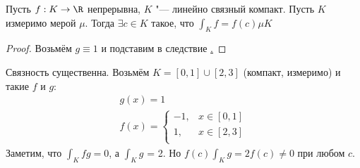 \begin{conseq}
	Пусть $f : K \to \R$ непрерывна, $K$ "--- линейно связный компакт.
	Пусть $K$ измеримо мерой $\mu$.
	Тогда $\exists c \in K$ такое, что $\int_K f = f(c) \mu K$
\end{conseq}
\begin{proof}
	Возьмём $g \equiv 1$ и подставим в следствие \href{23_lin_conn}.
\end{proof}
\begin{exmp}
	Связность существенна.
	Возьмём $K = [0,1] \cup [2,3]$ (компакт, измеримо) и такие $f$ и $g$:
	\begin{gather*}
	g(x) = 1 \\
	f(x) = \begin{cases}
		-1, & x \in [0,1] \\
		1, & x \in [2,3] \\
	\end{cases}
	\end{gather*}
	Заметим, что $\int_K fg = 0$, а $\int_K g$ = 2.
	Но $f(c) \int_K g = 2f(c) \neq 0$ при любом $c$.
\end{exmp}

